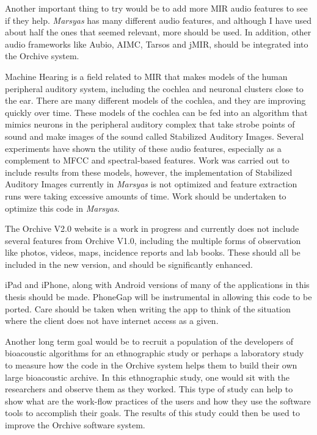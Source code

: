 Another important thing to try would be to add more MIR audio features
to see if they help.  \textit{Marsyas} has many different audio features, and
although I have used about half the ones that seemed relevant, more
should be used.  In addition, other audio frameworks like Aubio, AIMC,
Tarsos and jMIR, should be integrated into the Orchive system.

Machine Hearing is a field related to MIR that makes models of the
human peripheral auditory system, including the cochlea and neuronal
clusters close to the ear.  There are many different models of the
cochlea, and they are improving quickly over time.  These models of
the cochlea can be fed into an algorithm that mimics neurons in the
peripheral auditory complex that take strobe points of sound and make
images of the sound called Stabilized Auditory Images.  Several
experiments have shown the utility of these audio features, especially
as a complement to MFCC and spectral-based features.  Work was carried
out to include results from these models, however, the implementation
of Stabilized Auditory Images currently in \textit{Marsyas} is not optimized
and feature extraction runs were taking excessive amounts of time.
Work should be undertaken to optimize this code in \textit{Marsyas}.

The Orchive V2.0 website is a work in progress and currently does not
include several features from Orchive V1.0, including the multiple
forms of observation like photos, videos, maps, incidence reports and
lab books.  These should all be included in the new version, and
should be significantly enhanced.

iPad and iPhone, along with Android versions of many of the
applications in this thesis should be made.  PhoneGap will be
instrumental in allowing this code to be ported.  Care should be taken
when writing the app to think of the situation where the client does
not have internet access as a given.

Another long term goal would be to recruit a population of the
developers of bioacoustic algorithms for an ethnographic study or
perhaps a laboratory study to measure how the code in the Orchive
system helps them to build their own large bioacoustic archive.  In
this ethnographic study, one would sit with the researchers and
observe them as they worked.  This type of study can help to show what
are the work-flow practices of the users and how they use the software
tools to accomplish their goals.  The results of this study could then
be used to improve the Orchive software system.

